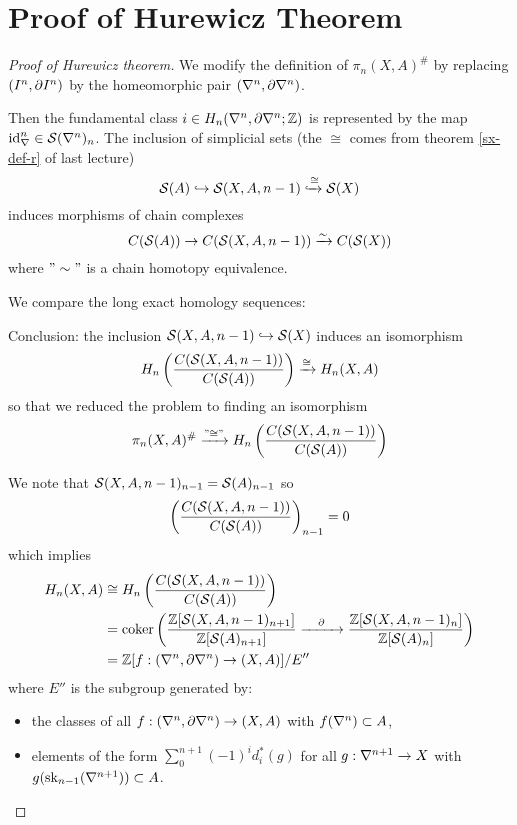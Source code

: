 
\section{Proof of Hurewicz Theorem}


\begin{proof}[Proof of Hurewicz theorem]
We modify the definition of $\pi_n(X,A)^\#$ by replacing $\pair$ by the homeomorphic pair $(\ns,\de\ns)$.

Then the fundamental class $i\in H_n(\ns,\de\ns;\Z)$ is represented by the map $\id_\ns\in\S(\ns)_n$. The inclusion of simplicial sets (the $\cong$ comes from theorem \ref{sx-def-r} of last lecture)
\[\S(A)\into\S(X,A,n-1)\xinto{\cong}\S(X)\]
induces morphisms of chain complexes
\[C(\S(A))\to C(\S(X,A,n-1))\xto{\sim}C(\S(X))\]
where $"\sim"$ is a chain homotopy equivalence.

We compare the long exact homology sequences:
\begin{center}
    \small
\end{center}

Conclusion: the inclusion $\S(X,A,n-1)\into\S(X)$ induces an isomorphism
\[H_n\left(\frac{C(\S(X,A,n-1))}{C(\S(A))}\right)\xto{\cong} H_n(X,A)\]
so that we reduced the problem to finding an isomorphism
\[\pi_n(X,A)^\#\xto{"\cong"} H_n\left(\frac{C(\S(X,A,n-1))}{C(\S(A))}\right)\]

We note that $\S(X,A,\ni)_\ni=\S(A)_\ni$ so
\[\left(\frac{C(\S(X,A,n-1))}{C(\S(A))}\right)_\ni=0\]
which implies
\begin{align*}
    H_n(X,A)&\cong H_n\left(\frac{C(\S(X,A,n-1))}{C(\S(A))}\right) \\
    &=\coker\left(\frac{\Z[\S(X,A,\ni)_{n+1}]}{\Z[\S(A)_{n+1}]}\xto{\quad \partial\quad} \frac{\Z[\S(X,A,\ni)_n]}{\Z[\S(A)_n]}\right) \\
    &=\Z[f:(\ns,\de\ns)\to (X,A)]/E''
\end{align*}
where $E''$ is the subgroup generated by:
\begin{itemize}[label={-}]
    \item the classes of all $f:(\ns,\de\ns)\to(X,A)$ with $f(\ns)\subset A$,
    \item elements of the form $\sum_0^{n+1}(-1)^id_i^*(g)$ for all $g:\sx{n+1}\to X$ with $g(\sk_\ni(\sx{n+1}))\subset A$.
\end{itemize}


\end{proof}
